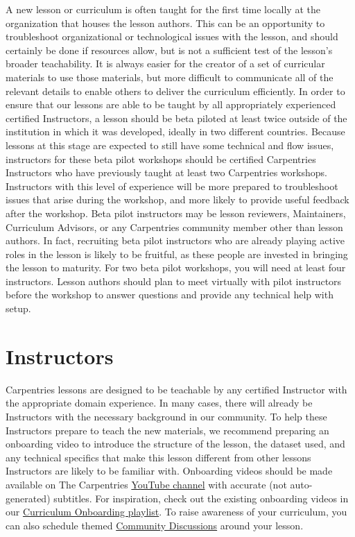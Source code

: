 \documentclass[
]{book}
\begin{document}
A new lesson or curriculum is often taught for the first time locally at
the organization that houses the lesson authors. This can be an opportunity
to troubleshoot organizational or technological issues with the lesson, and
should certainly be done if resources allow, but is
not a sufficient test of the lesson's broader teachability. It is always easier
for the creator of a set of curricular materials to use those materials, but
more difficult to communicate all of the relevant details to enable
others to deliver the curriculum efficiently. In order to ensure
that our lessons are able to be taught by all appropriately experienced
certified Instructors, a lesson should be beta piloted at least twice outside of the institution
in which it was developed, ideally in two different countries. Because lessons at this stage are
expected to still have some technical and flow issues, instructors for these beta pilot
workshops should be certified Carpentries Instructors who have previously taught at least two
Carpentries workshops. Instructors with this level of experience will be more prepared to troubleshoot
issues that arise during the workshop, and more likely to provide useful feedback after the workshop.
Beta pilot instructors may be lesson reviewers,
Maintainers, Curriculum Advisors, or any Carpentries community member other than
lesson authors. In fact, recruiting beta pilot instructors who are already playing active roles
in the lesson is likely to be fruitful,
as these people are invested in bringing the lesson
to maturity. For two beta pilot workshops, you will need at least four instructors. Lesson
authors should plan to meet virtually with pilot instructors before the workshop to
answer questions and provide any technical help with setup.

\hypertarget{instructors}{%
\section{Instructors}\label{instructors}}

Carpentries lessons are designed to be teachable by any certified Instructor with the
appropriate domain experience. In many cases, there will already be Instructors with
the necessary background in our community. To help these Instructors prepare to teach
the new materials, we recommend preparing an onboarding video to introduce the
structure of the lesson, the dataset used, and any technical specifics that make
this lesson different from other lessons Instructors are likely to be familiar with.
Onboarding videos should be made available on The Carpentries \href{https://www.youtube.com/c/thecarpentries}{YouTube channel}
with accurate (not auto-generated) subtitles. For inspiration,
check out the existing onboarding videos in our \href{https://www.youtube.com/watch?v=zgdutO5tejo\&list=PLXLapl_LKb4e73Vf2e3rS2q2TDJ7oh_DX}{Curriculum Onboarding playlist}. To raise awareness of your curriculum,
you can also schedule themed \href{https://pad.carpentries.org/community-discussions}{Community Discussions} around your lesson.
\end{document}
